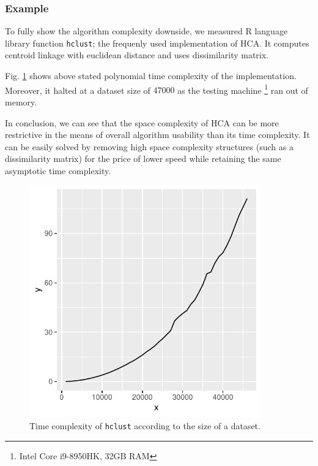\subsubsection{Example}

To fully show the algorithm complexity downside, we measured R language library function \texttt{hclust}; the frequenly used implementation of HCA. It computes centroid linkage with euclidean distance and uses dissimilarity matrix. 

Fig. \ref{fig01:hclust} shows above stated polynomial time complexity of the implementation. Moreover, it halted at a dataset size of $47 000$ as the testing machine \footnote{Intel Core i9-8950HK, 32GB RAM} ran out of memory.

In conclusion, we can see that the space complexity of HCA can be more restrictive in the means of overall algorithm usability than its time complexity. It can be easily solved by removing high space complexity structures (such as a dissimilarity matrix) for the price of lower speed while retaining the same asymptotic time complexity.

\begin{figure}\centering
	\includegraphics[width=10cm]{img/hclust}
	\caption{Time complexity of \texttt{hclust} according to the size of a dataset.}
	\label{fig01:hclust}
\end{figure}
